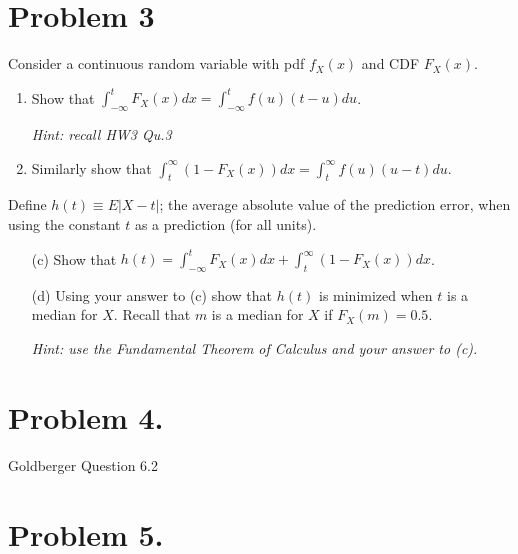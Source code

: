 \documentclass{article}
\newcommand{\1}{\mathbf{1}}
\begin{document}
\newpage
\section*{Problem 3}
Consider a continuous random variable with pdf $f_X(x)$ and CDF $F_X(x)$.
\begin{enumerate}
    \item Show that $\int_{-\infty}^t F_X(x) dx = \int_{-\infty}^t f(u) (t-u) du$.\par {\it Hint: recall HW3 Qu.3}
    \item Similarly show that $\int_{t}^\infty (1-F_X(x)) dx = \int_{t}^\infty f(u) (u-t) du$.
\end{enumerate}
Define $h(t) \equiv E|X-t|$; the average absolute value of the prediction error, when using the constant $t$ as a prediction (for all units).
\begin{enumerate}
    \item[(c)] Show that $h(t) =  \int_{-\infty}^t F_X(x) dx + \int_t^\infty(1 - F_X(x))dx$.
    \item[(d)] Using your answer to (c) show that $h(t)$ is minimized when $t$ is a median for $X$. Recall that $m$ is a median for $X$ if $F_X(m) = 0.5$.\par
            {\it Hint: use the Fundamental Theorem of Calculus and your answer to (c).}
\end{enumerate}



\newpage
\section*{Problem 4.} Goldberger Question 6.2



\newpage
\section*{Problem 5.} 
\end{document}
